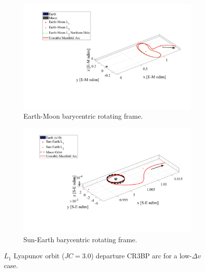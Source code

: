 \begin{figure}[H]
    \begin{subfigure}[h]{0.495\linewidth}
        \includegraphics[width=\textwidth]{figures/DirectMinDvEM.pdf}
        \caption{Earth-Moon barycentric rotating frame.}
    \end{subfigure}
    \hfill
    \begin{subfigure}[h]{0.495\linewidth}
        \includegraphics[width=\textwidth]{figures/DirectMinDvSE.pdf}
        \caption{Sun-Earth barycentric rotating frame.}
    \end{subfigure}
    \caption{$L_{1}$ Lyapunov orbit ($JC=3.0$) departure CR3BP arc for a low-$\Delta v$ case.}
    \label{fig:directMinDvE}
\end{figure}

